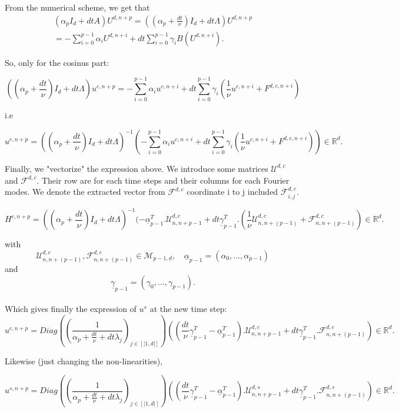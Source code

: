 \documentclass[12pt]{article}
\begin{document}
From the numerical scheme, we get that 
\begin{align*}
  (\alpha_p I_d + dtA)U^{d,n+p} = ((\alpha_p+\frac{dt}{\nu}) I_d + dt\Lambda)U^{d,n+p}\\
  = -\sum_{i=0}^{p-1}\alpha_iU^{d,n+i} + dt\sum_{i=0}^{p-1}\gamma_i B(U^{d,n+i}).
\end{align*}

So, only for the cosinus part:  
  
$$((\alpha_p+\frac{dt}{\nu}) I_d + dt\Lambda)u^{c,n+p}= -\sum_{i=0}^{p-1}\alpha_iu^{c,n+i} + dt\sum_{i=0}^{p-1}\gamma_i (\frac{1}{\nu} u^{c, n+i} + F^{d, c, n+i})$$

i.e 

$$u^{c, n+p}= ((\alpha_p+\frac{dt}{\nu}) I_d + dt\Lambda)^{-1}(-\sum_{i=0}^{p-1}\alpha_iu^{c, n+i} + dt\sum_{i=0}^{p-1}\gamma_i (\frac{1}{\nu} u^{c, n+i} + F^{d,c, n+i})) \in \mathbb{R}^d.$$

Finally, we "vectorize" the expression above. We introduce some matrices $\mathcal{U}^{d,c}$ and $\mathcal{F}^{d,c}$. Their row are for each time steps and their columns for each Fourier modes. We denote the extracted vector from $\mathcal{F}^{d,c}$ coordinate i to j included $\mathcal{F}_{i,j}^{d,c}$.


  $$H^{c, n+p}= ((\alpha_p+\frac{dt}{\nu}) I_d + dt\Lambda)^{-1}(-\underline{\alpha}_{p-1}^T.\mathcal{U}_{n, n+p-1}^{d,c}+ dt \underline{\gamma}_{p-1}^T.(\frac{1}{\nu} \mathcal{U}_{n, n+(p-1)}^{d,c} + \mathcal{F}_{n, n+(p-1)}^{d,c}) \in \mathbb{R}^d.$$

with  
$$\mathcal{U}_{n, n+(p-1)}^{d,c}, \mathcal{F}_{n, n+(p-1)}^{d,c} \in \mathcal{M}_{p-1, d},\quad \underline{\alpha}_{p-1} = (\alpha_0,..., \alpha_{p-1}) $$
and $$\underline{\gamma}_{p-1}= (\gamma_0, ..., \gamma_{p-1}).$$
\\ 

Which gives finally the expression of $u^s$ at the new time step:  
\begin{equation}
    \boxed{
    u^{c, n+p}= Diag((\frac{1}{\alpha_p+\frac{dt}{\nu} + dt\lambda_j})_{j\in [|1, d|]}) ((\frac{dt}{\nu} \underline{\gamma}_{p-1}^T-\underline{\alpha}_{p-1}^T).\mathcal{U}_{n, n+p-1}^{d,c}+ dt \underline{\gamma}_{p-1}^T.\mathcal{F}_{n, n+(p-1)}^{d, c}) \in \mathbb{R}^d.
    }
\end{equation}

Likewise (just changing the non-linearities),

\begin{equation}
    \boxed{
    u^{s, n+p}= Diag((\frac{1}{\alpha_p+\frac{dt}{\nu} + dt\lambda_j})_{j\in [|1, d|]}) ((\frac{dt}{\nu} \underline{\gamma}_{p-1}^T-\underline{\alpha}_{p-1}^T).\mathcal{U}_{n, n+p-1}^{d,s}+ dt \underline{\gamma}_{p-1}^T.\mathcal{F}_{n, n+(p-1)}^{d, s}) \in \mathbb{R}^d.
    }
\end{equation}
\end{document}
